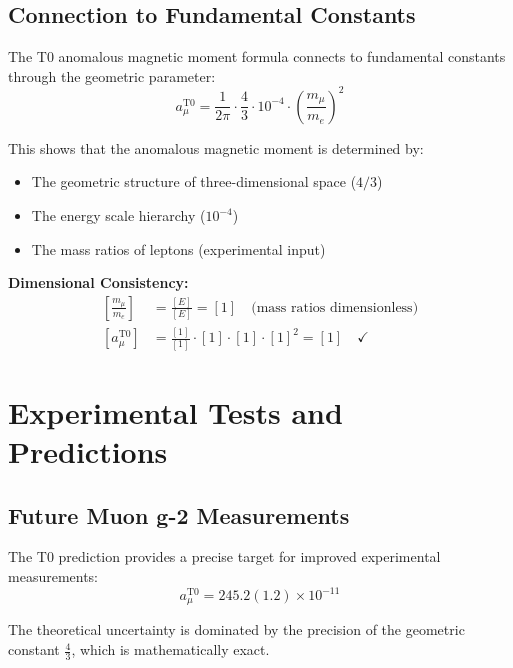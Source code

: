 \documentclass[12pt,a4paper]{report}
\begin{document}
	\subsection{Connection to Fundamental Constants}
	\label{subsec:connection_fundamental_constants}
	
	The T0 anomalous magnetic moment formula connects to fundamental constants through the geometric parameter:
	\begin{equation}
		a_\mu^{\text{T0}} = \frac{1}{2\pi} \cdot \frac{4}{3} \cdot 10^{-4} \cdot \left(\frac{m_\mu}{m_e}\right)^2
	\end{equation}
	
	This shows that the anomalous magnetic moment is determined by:
	\begin{itemize}
		\item The geometric structure of three-dimensional space ($4/3$)
		\item The energy scale hierarchy ($10^{-4}$)
		\item The mass ratios of leptons (experimental input)
	\end{itemize}
	
	\textbf{Dimensional Consistency:}
	\begin{align}
		\left[\frac{m_\mu}{m_e}\right] &= \frac{[E]}{[E]} = [1] \quad \text{(mass ratios dimensionless)} \\
		[a_\mu^{\text{T0}}] &= \frac{[1]}{[1]} \cdot [1] \cdot [1] \cdot [1]^2 = [1] \quad \checkmark
	\end{align}
	
	\section{Experimental Tests and Predictions}
	\label{sec:experimental_tests}
	
	\subsection{Future Muon g-2 Measurements}
	\label{subsec:future_measurements}
	
	The T0 prediction provides a precise target for improved experimental measurements:
	\begin{equation}
		a_\mu^{\text{T0}} = 245.2(1.2) \times 10^{-11}
	\end{equation}
	
	The theoretical uncertainty is dominated by the precision of the geometric constant $\frac{4}{3}$, which is mathematically exact.
	
\end{document}
